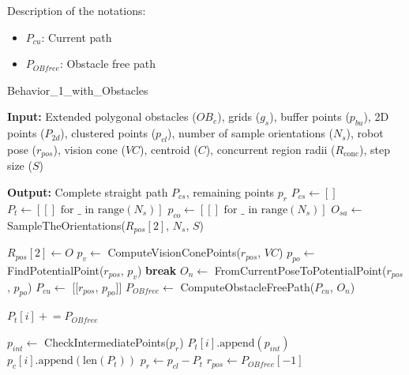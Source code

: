 \vspace{3mm}  



Description of the notations:
\begin{itemize}[noitemsep,topsep=0pt]
    \item $P_{cu}$: Current path
    \item $P_{OB free}$: Obstacle free path
\end{itemize}

\begin{algorithm}[H]
    \caption{Behavior\_1\_with\_Obstacles}
    \label{alg:behavioral1_obs}
    \begin{algorithmic}[1]

    \Statex \textbf{Input:} Extended polygonal obstacles ($OB_e$), grids ($g_s$), buffer points ($p_{bu}$), 2D points ($P_{2d}$), clustered points ($p_{cl}$), number of sample orientations ($N_s$), robot pose ($r_{pos}$), vision cone ($VC$), centroid ($C$), concurrent region radii ($R_{\text{conc}}$), step size ($S$)

    \Statex \textbf{Output:} Complete straight path $P_{cs}$, remaining points $p_r$
    \newline
    \State $P_{cs} \leftarrow []$
    \State $P_t \leftarrow [[] \text{ for } \_ \text{ in range}(N_s)]$
    \State $p_{co} \leftarrow [[] \text{ for } \_ \text{ in range}(N_s)]$
    \State $O_{sa} \leftarrow$ SampleTheOrientations($R_{pos}[2]$, $N_s$, $S$)
    
        \State $R_{pos}[2] \leftarrow O$
            \State $p_v \leftarrow$ ComputeVisionConePoints($r_{pos}$, $VC$)
            \State $p_{po} \leftarrow$ FindPotentialPoint($r_{pos}$, $p_v$)
                \State \textbf{break}
            \EndIf
            \State $O_n \leftarrow$ FromCurrentPoseToPotentialPoint($r_{pos}$, $p_{po}$)
            \State $P_{cu} \leftarrow$ [[$r_{pos}$, $p_{po}$]]
            \State $P_{OB free} \leftarrow$ ComputeObstacleFreePath($P_{cu}$, $O_n$)


            \State $P_t[i] \mathrel{+}= P_{OB free}$
            
            \State $p_{int} \leftarrow$ CheckIntermediatePoints($p_r$)
            \State $P_t[i].\text{append}(p_{int})$
            \State $p_c[i].\text{append}(\text{len}(P_t))$
            \State $p_r \leftarrow p_{cl} - P_t$
            \State $r_{pos} \leftarrow P_{OB free}[-1]$
        \EndWhile
    \EndFor
    

\end{algorithmic}
\end{algorithm}
